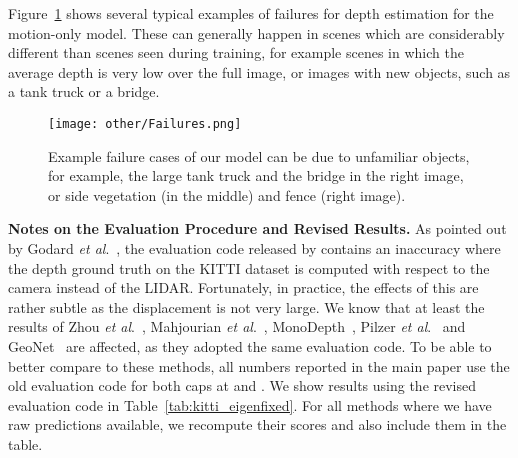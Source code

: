\documentclass[10pt,twocolumn,letterpaper]{article}
\newcommand{\ea}{\textit{et al}.}
\begin{document}
Figure~\ref{fig:result_failures} shows several typical examples of failures for depth estimation for the motion-only model. These can generally happen in scenes which are considerably different than scenes seen during training, for example scenes in which the average depth is very low over the full image, or images with new objects, such as a tank truck or a bridge.  

\begin{figure}
    \begin{center}
    \texttt{[image: other/Failures.png]}
    \end{center}
    \caption{Example failure cases of our model can be due to unfamiliar objects, for example, the large tank truck and the bridge in the right image, or side vegetation (in the middle) and fence (right image).}
    \label{fig:result_failures}
\end{figure}

\textbf{Notes on the Evaluation Procedure and Revised Results.}
As pointed out by Godard \ea~\cite{godard2018digging}, the evaluation code released by \cite{zhou2017unsupervised} contains an inaccuracy where the depth ground truth on the KITTI dataset is computed with respect to the camera instead of the LIDAR. Fortunately, in practice, the effects of this are rather subtle as the displacement is not very large. We know that at least the results of Zhou \ea~\cite{zhou2017unsupervised}, Mahjourian \ea~\cite{mahjourian2018unsupervised}, MonoDepth~\cite{godard2017monodepth}, Pilzer \ea~\cite{pilzer2018unsupervised} and GeoNet~\cite{yin2018geonet} are affected, as they adopted the same evaluation code. To be able to better compare to these methods, all numbers reported in the main paper use the old evaluation code for both caps at  and . We show results using the revised evaluation code in Table~\ref{tab:kitti_eigenfixed}. For all methods where we have raw predictions available, we recompute their scores and also include them in the table.
\end{document}
